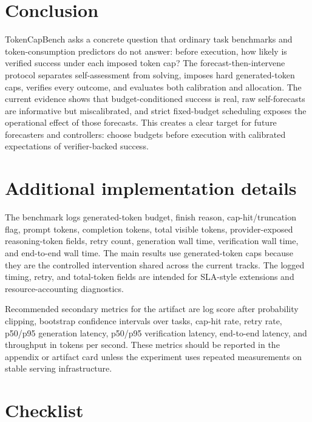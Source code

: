 \documentclass{article}
\newcommand{\bench}{TokenCapBench\xspace}
\begin{document}


\section{Conclusion}

\bench asks a concrete question that ordinary task benchmarks and token-consumption predictors do not answer: before execution, how likely is verified success under each imposed token cap? The forecast-then-intervene protocol separates self-assessment from solving, imposes hard generated-token caps, verifies every outcome, and evaluates both calibration and allocation. The current evidence shows that budget-conditioned success is real, raw self-forecasts are informative but miscalibrated, and strict fixed-budget scheduling exposes the operational effect of those forecasts. This creates a clear target for future forecasters and controllers: choose budgets before execution with calibrated expectations of verifier-backed success.

\clearpage



\clearpage
\appendix
\section{Additional implementation details}
\label{app:implementation}
The benchmark logs generated-token budget, finish reason, cap-hit/truncation flag, prompt tokens, completion tokens, total visible tokens, provider-exposed reasoning-token fields, retry count, generation wall time, verification wall time, and end-to-end wall time. The main results use generated-token caps because they are the controlled intervention shared across the current tracks. The logged timing, retry, and total-token fields are intended for SLA-style extensions and resource-accounting diagnostics.

Recommended secondary metrics for the artifact are log score after probability clipping, bootstrap confidence intervals over tasks, cap-hit rate, retry rate, p50/p95 generation latency, p50/p95 verification latency, end-to-end latency, and throughput in tokens per second. These metrics should be reported in the appendix or artifact card unless the experiment uses repeated measurements on stable serving infrastructure.

\section{Checklist}

\end{document}
